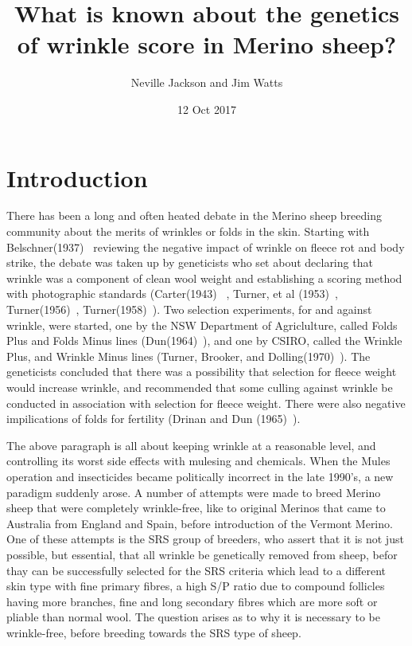 \documentclass[titlepage]{article}  %
\title{What is known about the genetics of wrinkle score in Merino sheep?}
\author{Neville Jackson and Jim Watts}
\date{12 Oct 2017}
\begin{document}
 
 
\maketitle      
\tableofcontents

\clearpage
\section{Introduction} 
There has been a long and often heated debate in the Merino sheep breeding community about the merits of wrinkles or folds in the skin. Starting with Belschner(1937)~\cite{bels:37} reviewing the negative impact of wrinkle on fleece rot and body strike, the debate was taken up by geneticists who set about declaring that wrinkle was a component of clean wool weight and establishing a scoring method with photographic standards (Carter(1943)~\cite{cart:43} , Turner, et al (1953)~\cite{turn:53},  Turner(1956)~\cite{turn:56}, Turner(1958)~\cite{turn:58}). Two selection experiments, for and against wrinkle, were started, one by the NSW Department of Agriclulture, called Folds Plus and Folds Minus lines (Dun(1964)~\cite{dun:64}), and one by CSIRO, called the Wrinkle Plus, and Wrinkle Minus lines (Turner, Brooker, and Dolling(1970)~\cite{turn:70}). The geneticists concluded that there was a possibility that selection for fleece weight would increase wrinkle, and recommended that some culling against wrinkle be conducted in association with selection for fleece weight. There were also negative impilications of folds for fertility (Drinan and Dun (1965)~\cite{drin:65}).

The above paragraph is all about keeping wrinkle at a reasonable level, and controlling its worst side effects with mulesing and chemicals. When the Mules operation  and insecticides became politically incorrect in the late 1990's, a new paradigm suddenly arose.  A number of attempts were made to breed Merino sheep that were completely wrinkle-free, like to original Merinos that came to Australia from England and Spain, before introduction of the  Vermont Merino.  One of these attempts is the SRS group of breeders, who assert that it is not just possible, but essential, that all wrinkle be genetically removed from sheep, befor thay can be successfully selected for the SRS criteria which lead to a different skin type with fine primary fibres, a high S/P ratio due to compound follicles having more branches, fine and long secondary fibres which are more soft or pliable than normal wool. The question arises as to why it is necessary to be wrinkle-free, before breeding towards the SRS type of sheep.
\end{document}
